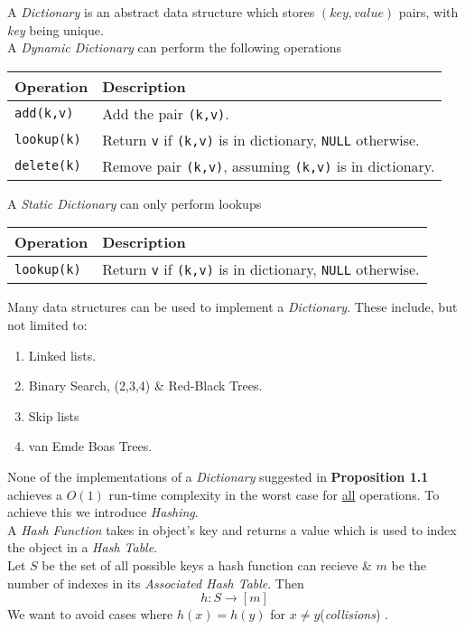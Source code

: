 \documentclass[11pt,a4paper]{article}
\begin{document}
A \textit{Dictionary} is an abstract data structure which stores $(\textit{key},\textit{value})$ pairs, with \textit{key} being unique.\\
A \textit{Dynamic Dictionary} can perform the following operations
\begin{center}
\begin{tabular}{l|l}
\textbf{Operation}&\textbf{Description}\\\hline
\lstinline!add(k,v)!&Add the pair \lstinline!(k,v)!.\\
\lstinline!lookup(k)!&Return \lstinline!v! if \lstinline!(k,v)! is in dictionary, \lstinline!NULL! otherwise.\\
\lstinline!delete(k)!&Remove pair \lstinline!(k,v)!, assuming \lstinline!(k,v)! is in dictionary.
\end{tabular}
\end{center}
A \textit{Static Dictionary} can only perform lookups
\begin{center}
\begin{tabular}{l|l}
\textbf{Operation}&\textbf{Description}\\\hline
\lstinline!lookup(k)!&Return \lstinline!v! if \lstinline!(k,v)! is in dictionary, \lstinline!NULL! otherwise.
\end{tabular}
\end{center}

Many data structures can be used to implement a \textit{Dictionary}. These include, but not limited to:
\begin{enumerate}
	\item Linked lists.
	\item Binary Search, (2,3,4) \& Red-Black Trees.
	\item Skip lists
	\item van Emde Boas Trees.
\end{enumerate}

None of the implementations of a \textit{Dictionary} suggested in \textbf{Proposition 1.1} achieves a $O(1)$ run-time complexity in the worst case for \underline{all} operations. To achieve this we introduce \textit{Hashing}.\\

A \textit{Hash Function} takes in object's key and returns a value which is used to index the object in a \textit{Hash Table}.\\
Let $S$ be the set of all possible keys a hash function can recieve \& $m$ be the number of indexes in its \textit{Associated Hash Table}. Then
$$h:S\to[m]$$
\nb We want to avoid cases where $h(x)=h(y)$ for $x\neq y$(\textit{collisions}) .\\
\end{document}
